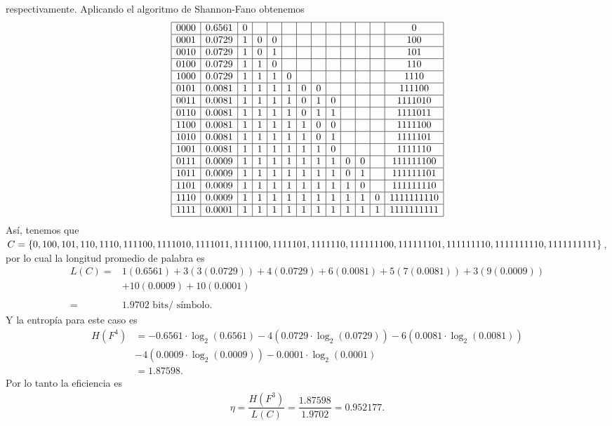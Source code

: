\begin{sol}
respectivamente. Aplicando el algoritmo de Shannon-Fano obtenemos  
\[
\begin{array}{|c|c|c|c|c|c|c|c|c|c|c|c|c|}
\hline
0000& 0.6561 & 0& &&&&&&&&&0\\
\hline
0001& 0.0729 &1 &0 &0 & & & & & & & &100 \\
\hline
0010& 0.0729 & 1& 0& 1& & & & & & & & 101\\
\hline
0100& 0.0729 & 1& 1&0 & & & & & & & & 110\\
\hline
1000& 0.0729 & 1& 1& 1&0 & & & & & & & 1110\\
\hline
0101& 0.0081 & 1& 1& 1& 1& 0&0 & & & & & 111100\\
\hline
0011& 0.0081 &1 & 1& 1& 1& 0& 1&0 & & & & 1111010\\
\hline
0110& 0.0081 & 1& 1& 1& 1& 0& 1& 1& & & & 1111011\\
\hline
1100& 0.0081 & 1& 1& 1& 1& 1& 0&0 & & & & 1111100\\
\hline
1010& 0.0081 & 1& 1& 1& 1& 1& 0& 1& & & & 1111101\\
\hline
1001& 0.0081 & 1& 1& 1& 1& 1& 1& 0& & & & 1111110\\
\hline
0111& 0.0009 & 1& 1& 1& 1& 1& 1& 1& 0&0 & &111111100 \\
\hline
1011& 0.0009  & 1&1 & 1& 1& 1& 1& 1& 0&1 & & 111111101\\
\hline
1101& 0.0009  & 1& 1& 1& 1& 1& 1& 1& 1& 0& & 111111110\\
\hline
1110& 0.0009  & 1& 1& 1& 1& 1& 1& 1& 1& 1&0 & 1111111110\\
\hline
1111& 0.0001  & 1& 1& 1& 1& 1& 1& 1& 1& 1& 1&  1111111111\\
\hline
\end{array}
\]
Así, tenemos que $C=\{ 0, 100, 101, 110, 1110, 111100, 1111010, 1111011, 1111100, 1111101,\\ 
1111110,  111111100, 111111101, 111111110, 1111111110, 1111111111\}$, por lo cual la longitud promedio de palabra es 
\begin{align*}
L(C)=& 1(0.6561) + 3(3(0.0729)) + 4(0.0729) +6( 0.0081) +5(7( 0.0081)) +3(9( 0.0009))\\
 &+10( 0.0009) + 10( 0.0001)\\
 \\
=& 1.9702 \text{ bits/ símbolo.}
\end{align*}
Y la entropía para este caso es
\begin{align*}
    H(F^{4})&=-0.6561 \cdot \log_2(0.6561) -4(0.0729 \cdot \log_2(0.0729)) - 6(0.0081 \cdot \log_2(0.0081)) \\
    &-4(0.0009 \cdot \log_2(0.0009))-0.0001 \cdot \log_2(0.0001)\\
    &= 1.87598
.\end{align*}
Por lo tanto la eficiencia es 
\begin{align*}
    \eta= \dfrac{H(F^{3})}{L(C)}=\dfrac{1.87598}{1.9702}=0.952177
.\end{align*}






 
 \end{sol}